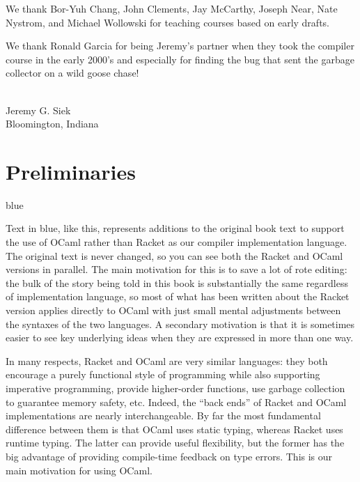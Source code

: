 \documentclass[11pt]{book}
\newenvironment{ocamlx}{
  \begin{color}{blue}
}
{
  \end{color}
}
\begin{document}
We thank Bor-Yuh Chang, John Clements, Jay McCarthy, Joseph Near, Nate
Nystrom, and Michael Wollowski for teaching courses based on early
drafts.

We thank Ronald Garcia for being Jeremy's partner when they took the
compiler course in the early 2000's and especially for finding the bug
that sent the garbage collector on a wild goose chase!

\mbox{}\\
\noindent Jeremy G. Siek \\
Bloomington, Indiana




\chapter{Preliminaries}
\label{ch:trees-recur}

\begin{ocamlx}
  Text in blue, like this, represents additions to the original book
  text to support the use of OCaml rather than Racket as our compiler
  implementation language.  The original text is never changed, so you
  can see both the Racket and OCaml versions in parallel. The main
  motivation for this is to save a lot of rote editing: the bulk of
  the story being told in this book is substantially the same
  regardless of implementation language, so most of what has been
  written about the Racket version applies directly to OCaml
  with just small mental adjustments between the syntaxes of the two
  languages.  A secondary motivation is that it is sometimes easier to
  see key underlying ideas when they are expressed in more than one
  way.

  In many respects, Racket and OCaml are very similar languages: they
  both encourage a purely functional style of programming while also supporting
  imperative programming, provide higher-order functions, use
  garbage collection to guarantee memory safety, etc.  Indeed, the
  ``back ends'' of Racket and OCaml implementations are nearly
  interchangeable. By far the most fundamental difference between them is
  that OCaml uses static typing, whereas Racket uses runtime typing.
  The latter can provide useful flexibility, but the former has the
  big advantage of providing compile-time feedback on type errors.
  This is our main motivation for using OCaml.
\end{ocamlx}
\end{document}
